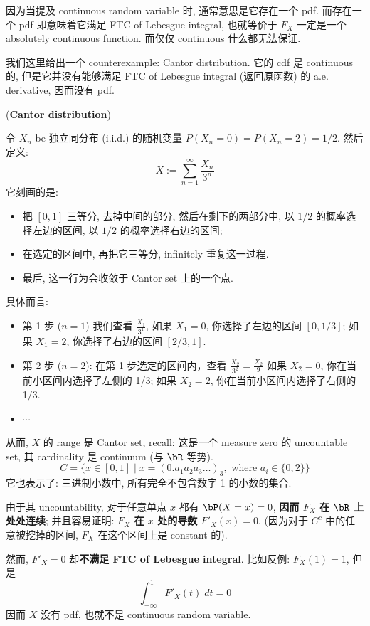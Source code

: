 因为当提及 continuous random variable 时, 通常意思是它存在一个 pdf. 
而存在一个 pdf 即意味着它满足 FTC of Lebesgue integral, 也就等价于 \(F_X\) 一定是一个 absolutely continuous function. 
而仅仅 continuous 什么都无法保证.


我们这里给出一个 counterexample: Cantor distribution. 它的 cdf 是 continuous 的, 但是它并没有能够满足 FTC of Lebesgue integral (返回原函数) 的 a.e. derivative,
因而没有 pdf.
\begin{example}{(\textbf{Cantor distribution})}

令 $X_n$ be 独立同分布 (i.i.d.) 的随机变量 $P(X_n=0) = P(X_n=2) = 1/2$. 然后定义:
    \[
    X := \sum_{n=1}^{\infty} \frac{X_n}{3^n}
    \]
它刻画的是:
\begin{itemize}
    \item 把 \([0,1]\) 三等分, 去掉中间的部分, 然后在剩下的两部分中, 以 \(1/2\) 的概率选择左边的区间, 以 \(1/2\) 的概率选择右边的区间;
    \item 在选定的区间中, 再把它三等分, infinitely 重复这一过程.
    \item 最后, 这一行为会收敛于 Cantor set 上的一个点. 
\end{itemize}
具体而言: 
\begin{itemize}
    \item 第 1 步 ($n=1$) 我们查看 $\frac{X_1}{3^1}$, 
 如果 $X_1=0$, 你选择了左边的区间 $[0, 1/3]$;
 如果 $X_1=2$, 你选择了右边的区间 $[2/3, 1]$.
 \item 第 2 步 ($n=2$): 在第 1 步选定的区间内，查看 $\frac{X_2}{3^2} = \frac{X_2}{9}$
 如果 $X_2=0$, 你在当前小区间内选择了左侧的 1/3; 如果 $X_2=2$, 你在当前小区间内选择了右侧的 1/3.
 \item \(\cdots\)
\end{itemize}

从而, \(X\) 的 range 是 Cantor set, recall: 
这是一个 measure zero 的 uncountable set, 其 cardinality 是 continuum (与 \(\bR\) 等势).
$$C = \{ x \in [0, 1] \mid x = (0.a_1 a_2 a_3 \dots)_3, \text{ where } a_i \in \{0, 2\} \}$$
它也表示了: 三进制小数中, 所有完全不包含数字 1 的小数的集合.

由于其 uncountability, 对于任意单点 \(x\) 都有 \(\bP(X = x) = 0\), \textbf{因而 \(F_X\) 在 \(\bR\) 上处处连续};
并且容易证明:\textbf{ \(F_X\) 在 \(x\) 处的导数 \(F'_X(x) = 0\)}. (因为对于 \(C^c\) 中的任意被挖掉的区间,
 \(F_X\) 在这个区间上是 constant 的).

然而, \(F'_X = 0\) 却\textbf{不满足 FTC of Lebesgue integral}. 比如反例: \(F_X(1) = 1\), 
但是 \[\int_{-\infty}^1 F'_X(t) \;dt = 0\]
因而 \(X\) 没有 pdf, 也就不是 continuous random variable.  
\end{example}



